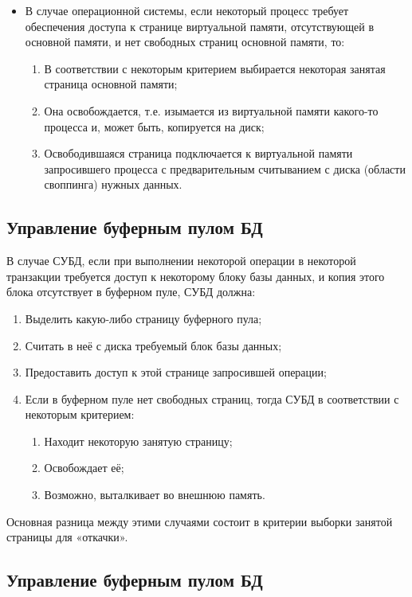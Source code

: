 \documentclass[a4paper,12pt]{article}
\begin{document}
\begin{itemize}
    \item В случае операционной системы, если некоторый процесс требует обеспечения доступа к странице виртуальной памяти, отсутствующей в основной памяти, и нет свободных страниц основной памяти, то:
    \begin{enumerate}
        \item В соответствии с некоторым критерием выбирается некоторая занятая страница основной памяти;
        \item Она освобождается, т.е. изымается из виртуальной памяти какого-то процесса и, может быть, копируется на диск;
        \item Освободившаяся страница подключается к виртуальной памяти запросившего процесса с предварительным считыванием с диска (области своппинга) нужных данных.
    \end{enumerate}
\end{itemize}

\subsection{Управление буферным пулом БД}

В случае СУБД, если при выполнении некоторой операции в некоторой транзакции требуется доступ к некоторому блоку базы данных, и копия этого блока отсутствует в буферном пуле, СУБД должна:
\begin{enumerate}
    \item Выделить какую-либо страницу буферного пула;
    \item Считать в неё с диска требуемый блок базы данных;
    \item Предоставить доступ к этой странице запросившей операции;
    \item Если в буферном пуле нет свободных страниц, тогда СУБД в соответствии с некоторым критерием:
    \begin{enumerate}
        \item Находит некоторую занятую страницу;
        \item Освобождает её;
        \item Возможно, выталкивает во внешнюю память.
    \end{enumerate}
\end{enumerate}

Основная разница между этими случаями состоит в критерии выборки занятой страницы для «откачки».

\subsection{Управление буферным пулом БД}
\end{document}
